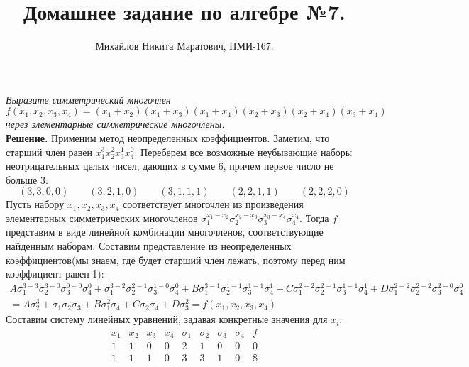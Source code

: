 \documentclass[a4paper, 12pt]{article}
\title{
     Домашнее задание по алгебре №7.
 }
\author{Михайлов Никита Маратович, ПМИ-167.
}
\date{}
\begin{document}
\maketitle
\begin{spacing}{1}



\begin{center}
\end{center}

\noindent \textit{Выразите симметрический многочлен
	$$
	f(x_1,x_2,x_3,x_4)=(x_1+x_2)(x_1+x_3)(x_1+x_4)(x_2+x_3)(x_2+x_4)(x_3+x_4)
	$$
	через элементарные симметрические многочлены.
}\\
\noindent \textbf{Решение.} Применим метод неопределенных коэффициентов. Заметим, что старший член равен $x_1^3x_2^2x_3^1x_4^0$. Переберем все возможные неубывающие наборы неотрицательных целых чисел, дающих в сумме 6, причем первое число не больше 3:
$$
(3,3,0,0)\qquad (3,2,1,0)\qquad(3,1,1,1)\qquad (2,2,1,1)\qquad(2,2,2,0)
$$
Пусть набору $x_1,x_2,x_3,x_4$ соответствует многочлен из произведения элементарных симметрических многочленов $\sigma_1^{x_1-x_2}\sigma_2^{x_2-x_3}\sigma_3^{x_3-x_4}\sigma_4^{x_4}$. Тогда $f$ представим в виде линейной комбинации многочленов, соответствующие найденным наборам. Составим представление из неопределенных коэффициентов(мы знаем, где будет старший член лежать, поэтому перед ним коэффициент равен 1):
\begin{gather*}
A\sigma_1^{3-3}\sigma_2^{3-0}\sigma_3^{0-0}\sigma_4^{0}+\sigma_1^{3-2}\sigma_2^{2-1}\sigma_3^{1-0}\sigma_4^{0}+B\sigma_1^{3-1}\sigma_2^{1-1}\sigma_3^{1-1}\sigma_4^{1}+C\sigma_1^{2-2}\sigma_2^{2-1}\sigma_3^{1-1}\sigma_4^{1}+D\sigma_1^{2-2}\sigma_2^{2-2}\sigma_3^{2-0}\sigma_4^{0}\\
=A\sigma_2^{3}+\sigma_1\sigma_2\sigma_3+B\sigma_1^2\sigma_4+C\sigma_2\sigma_4+D\sigma_3^2 = f(x_1,x_2,x_3,x_4)
\end{gather*}
Составим систему линейных уравнений, задавая конкретные значения для $x_i$:
$$
\begin{array}{c|c|c|c|c|c|c|c|c}
x_1 & x_2 & x_3 & x_4 & \sigma_1 & \sigma_2 & \sigma_3 & \sigma_4 & f\\
\hline
1 & 1 & 0 & 0 & 2 & 1 & 0 & 0 & 0\\
\hline
1 & 1 & 1 & 0 & 3 & 3 & 1 & 0 & 8\\

\end{array}$$
\end{spacing}
\end{document}
